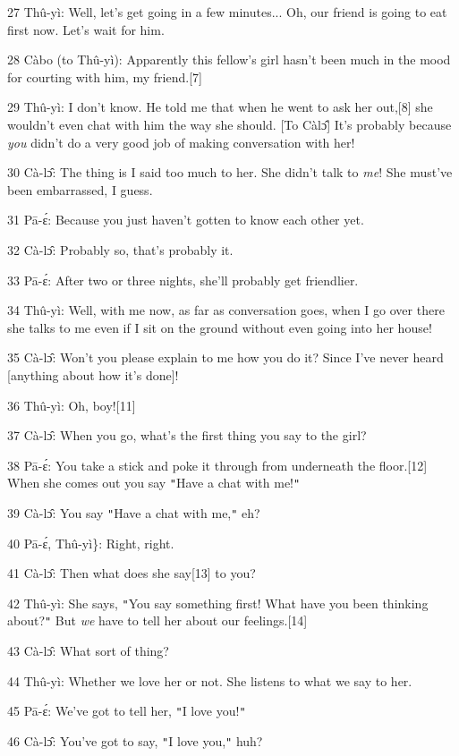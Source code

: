 {27 Thû-yì: Well, let's get going in a few minutes... Oh, our friend is
going to eat first now. Let's wait for him.}

{28  Càbo (to Thû-yì): Apparently this fellow's girl hasn't been much
in the mood for courting with him, my friend.[7]}

{29 Thû-yì: I don't know. He told me that when he went to ask her out,[8]
she wouldn't even chat with him the way she should. [To Càlɔ̂] It's probably
because }{\textit{you}}{ didn't do a very good job of making conversation
with her! }

{30 Cà-lɔ̂: The thing is I said too much to her. She didn't talk to}{\textit{
me}}{! She must've been embarrassed, I guess.}

{31 Pā-ɛ́: Because you just haven't gotten to know each other yet.}

{32 Cà-lɔ̂: Probably so, that's probably it.}

{33 Pā-ɛ́: After two or three nights, she'll probably get friendlier.}

{34 Thû-yì: Well, with me now, as far as conversation goes, when I go
over there she talks to me even if I sit on the ground without even going into
her house!}

{35 Cà-lɔ̂: Won't you please explain to me how you do it? Since I've
never heard [anything about how it's done]!}

{36 Thû-yì: Oh, boy![11]}

{37 Cà-lɔ̂: When you go, what's the first thing you say to the girl?}

{38 Pā-ɛ́: You take a stick and poke it through from underneath the
floor.[12] When she comes out you say \texttt{"}Have a chat with me!\texttt{"}}

{39 Cà-lɔ̂: You say \texttt{"}Have a chat with me,\texttt{"} eh?}

{40 Pā-ɛ́, Thû-yì\}: Right, right.}

{41 Cà-lɔ̂: Then what does she say[13] to you?}

{42 Thû-yì: She says, \texttt{"}You say something first! What have you
been thinking about?\texttt{"} But }{\textit{we}}{ have to tell her
about our feelings.[14]}

{43 Cà-lɔ̂: What sort of thing?}

{44 Thû-yì: Whether we love her or not. She listens to what we say to
her. }

{45 Pā-ɛ́: We've got to tell her, \texttt{"}I love you!\texttt{"}}

{46 Cà-lɔ̂: You've got to say, \texttt{"}I love you,\texttt{"} huh?}

